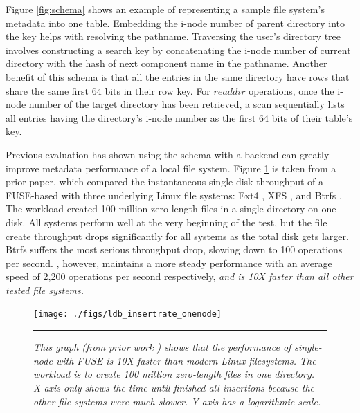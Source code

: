 Figure \ref{fig:schema} shows an example of representing
a sample file system's metadata into one table.
Embedding the i-node number of parent directory into the key
helps with resolving the pathname.
Traversing the user's directory tree
involves constructing a search key by concatenating the i-node
number of current directory with the hash of
next component name in the pathname.
Another benefit of this schema is that all the entries
in the same directory have rows that
share the same first 64 bits in their row key.
For $readdir$ operations, once the i-node number
of the target directory has been retrieved,
a scan sequentially lists all entries having
the directory's i-node number as the first 64 bits of their table's key.

Previous evaluation \cite{TableFS} has shown using
the \tfs schema with a \ldb backend
can greatly improve metadata performance of a local file system.
Figure \ref{graph:ldb-singlenode} is taken from a prior \tfs paper,
which compared the instantaneous single disk throughput of a FUSE-based \tfs
with three underlying Linux file systems: Ext4 \cite{Ext4}, XFS \cite{XFS}, and
Btrfs \cite{BTRFS}.
The workload created 100 million zero-length files in a single directory
on one disk.
All systems perform well at the very beginning of the test, but the file create
throughput drops significantly for all systems as the total disk gets larger.
Btrfs suffers the most serious throughput drop, slowing down to 100 operations
per second.
\tfs, however, maintains a more steady performance
with an average speed of 2,200 operations per second respectively,
\textit{and is 10X faster than all other tested file systems.}

\begin{figure}[t]  %
\centerline{\texttt{[image: ./figs/ldb\_insertrate\_onenode]}}
\vspace{10pt}
\caption{\textit{\footnotesize
This graph (from prior work \cite{TableFS}) shows
that the performance of single-node \tfs with FUSE is 10X faster than modern Linux
filesystems. The workload is to create 100 million zero-length files in one directory.
X-axis only shows the time until \tfs finished all insertions because the other
file systems were much slower. Y-axis has a logarithmic scale.}
}
\hrule 
\label{graph:ldb-singlenode}
\end{figure}       %
